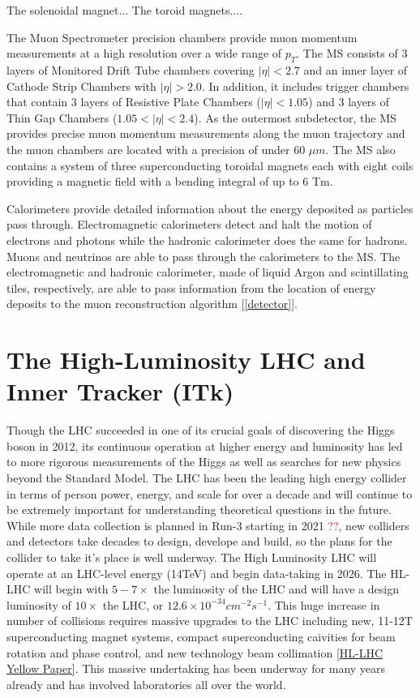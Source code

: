 The solenoidal magnet... The toroid magnets....

The Muon Spectrometer precision chambers provide muon momentum measurements at a high resolution over a wide range of $p_T$. The MS consists of $3$ layers of Monitored Drift Tube chambers covering $|\eta| < 2.7$ and an inner layer of Cathode Strip Chambers with $|\eta| > 2.0$. In addition, it includes trigger chambers that contain $3$ layers of Resistive Plate Chambers ($|\eta| < 1.05$) and $3$ layers of Thin Gap Chambers ($1.05 < |\eta| < 2.4$). As the outermost subdetector, the MS provides precise muon momentum measurements along the muon trajectory and the muon chambers are located with a precision of under $60$ $\mu m$. The MS also contains a system of three superconducting toroidal magnets each with eight coils providing a magnetic field with a bending integral of up to $6$ Tm. 

Calorimeters provide detailed information about the energy deposited as particles pass through. Electromagnetic calorimeters detect and halt the motion of electrons and photons while the hadronic calorimeter does the same for hadrons. Muons and neutrinos are able to pass through the calorimeters to the MS. The electromagnetic and hadronic calorimeter, made of liquid Argon and scintillating tiles, respectively, are able to pass information from the location of energy deposits to the muon reconstruction algorithm [\ref{detector}]. 

\section{The High-Luminosity LHC and Inner Tracker (ITk)}
Though the LHC succeeded in one of its crucial goals of discovering the Higgs boson in 2012, its continuous operation at higher energy and luminosity has led to more rigorous measurements of the Higgs as well as searches for new physics beyond the Standard Model. The LHC has been the leading high energy collider in terms of person power, energy, and scale for over a decade and will continue to be extremely important for understanding theoretical questions in the future. While more data collection is planned in Run-3 starting in 2021 \textcolor{red}{??}, new colliders and detectors take decades to design, develope and build, so the plans for the collider to take it's place is well underway. The High Luminosity LHC will operate at an LHC-level energy (14TeV) and begin data-taking in 2026. The HL-LHC will begin with $5-7\times$ the luminosity of the LHC and will have a design luminosity of $10\times$ the LHC, or $12.6\times10^{-34}cm^{-2}s^{-1}$. This huge increase in number of collisions requires massive upgrades to the LHC including new, 11-12T superconducting magnet systems, compact superconducting caivities for beam rotation and phase control, and new technology beam collimation \ref{HL-LHC Yellow Paper}. This massive undertaking has been underway for many years already and has involved laboratories all over the world.

